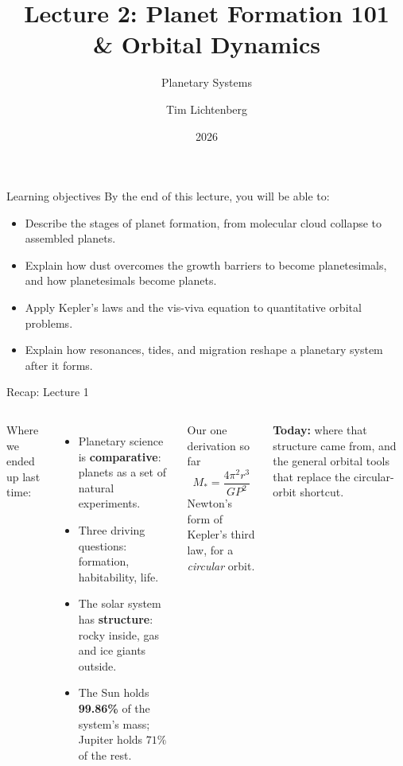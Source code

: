 \documentclass[aspectratio=169, 11pt]{beamer}
\title[L2: Planet Formation \& Orbital Dynamics]{Lecture 2: Planet Formation 101\\\& Orbital Dynamics}
\subtitle{Planetary Systems}
\author[T.~Lichtenberg]{Tim Lichtenberg}
\institute{Kapteyn Astronomical Institute\\University of Groningen}
\date{2026}
\begin{document}
\begin{frame}
  \titlepage
\end{frame}

\begin{frame}{Learning objectives}
  By the end of this lecture, you will be able to:
  \vskip6pt\relax
  \begin{itemize}
    \item Describe the stages of planet formation, from molecular cloud collapse to assembled planets.
    \item Explain how dust overcomes the growth barriers to become planetesimals, and how planetesimals become planets.
    \item Apply Kepler's laws and the vis-viva equation to quantitative orbital problems.
    \item Explain how resonances, tides, and migration reshape a planetary system after it forms.
  \end{itemize}
  \vskip6pt\relax
\end{frame}

\begin{frame}{Recap: Lecture 1}
  \begin{columns}[T]
    Where we ended up last time:
    \begin{itemize}
      \item Planetary science is \textbf{comparative}: planets as a set of natural experiments.
      \item Three driving questions: formation, habitability, life.
      \item The solar system has \textbf{structure}: rocky inside, gas and ice giants outside.
      \item The Sun holds \textbf{99.86\%} of the system's mass; Jupiter holds $71\%$ of the rest.
    \end{itemize}

    \begin{block}{Our one derivation so far}
      \[
        M_* = \frac{4\pi^2 r^3}{G P^2}
      \]
      Newton's form of Kepler's third law, for a \emph{circular} orbit.
    \end{block}
    \vskip8pt\relax
    \textbf{Today:} where that structure came from, and the general orbital tools that replace the circular-orbit shortcut.
  \end{columns}
\end{frame}
\end{document}

